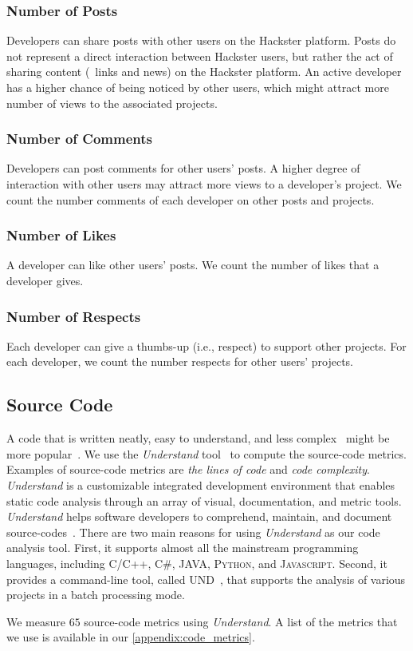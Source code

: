 \subsubsection*{Number of Posts}
Developers can share posts with other users on the Hackster platform. Posts do not represent a direct interaction between Hackster users, but rather the act of sharing content (\eg~links and news) on the Hackster platform.
An active developer has a higher chance of being noticed by other users, which might attract more number of views to the associated projects.

\subsubsection*{Number of Comments}
Developers can post comments for other users' posts. A higher degree of interaction with other users may attract more views to a developer's project.
We count the number comments of each developer on other posts and projects.

\subsubsection*{Number of Likes}
A developer can like other users' posts. We count the number of likes that a
developer gives.

\subsubsection*{Number of Respects}
Each developer can give a thumbs-up (i.e., respect) to support other projects. For each developer, we count the number respects for other users' projects.

\subsection{Source Code}

A code that is written neatly, easy to understand, and less
complex~\cite{storey2006theories} might be more popular~\cite{noei2017study}.
We use the \textit{Understand} tool~\cite{understand,understandfeatues} to
compute the source-code metrics.  Examples of source-code metrics are
\textit{the lines of code} and \textit{code complexity}.  \textit{Understand}
is a customizable integrated development environment that enables static code
analysis through an array of visual, documentation, and metric tools.
\textit{Understand} helps software developers to comprehend, maintain, and
document source-codes~\cite{understand}. There are two main reasons for using
\textit{Understand} as our code analysis tool. First, it supports almost all
the mainstream programming languages, including \textsc{C/C++}, \textsc{C\#},
\textsc{JAVA}, \textsc{Python}, and \textsc{Javascript}.  Second, it provides a
command-line tool, called UND~\cite{understandcmd}, that supports the analysis
of various projects in a batch processing mode.  

We measure $65$ source-code
metrics using \textit{Understand}. A list of the metrics that we use is available in our \ref{appendix:code_metrics}. 

